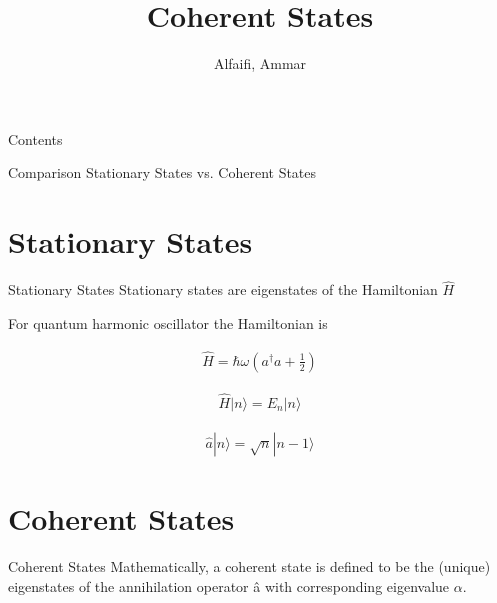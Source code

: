 \documentclass{loyola-beamer}
\title{Coherent States}
\author{Alfaifi, Ammar}
\institute{KFUPM}
\begin{document}
\begin{titleframe}{}
    \maketitle
\end{titleframe}

\begin{frame}{Contents}
    \tableofcontents
\end{frame}



\begin{titleframe}{Comparison}
    Stationary States vs. Coherent States
\end{titleframe}

\section{Stationary States}

\begin{frame}{Stationary States}
    Stationary states are eigenstates of the Hamiltonian $\hat{H}$

    \vspace{\baselineskip}
    For quantum harmonic oscillator the Hamiltonian is

    \begin{align*}
        \hat{H} = \hbar \omega \left(  a^\dagger a + \frac{1}{2} \right)
        \label{eq:Hamiltonian}
    \end{align*}

    \begin{align*}
        \hat{H} |n \rangle = E_n |n \rangle
    \end{align*}

    \begin{align*}
        \hat{a} |n \rangle = \sqrt{n} |{n-1} \rangle
    \end{align*}

\end{frame}


\section{Coherent States}

\begin{frame}{Coherent States}
    Mathematically, a coherent state is defined to be the (unique)
    eigenstates of the annihilation operator â with corresponding eigenvalue $\alpha$.

    \vspace{\baselineskip}
\end{frame}
\end{document}
